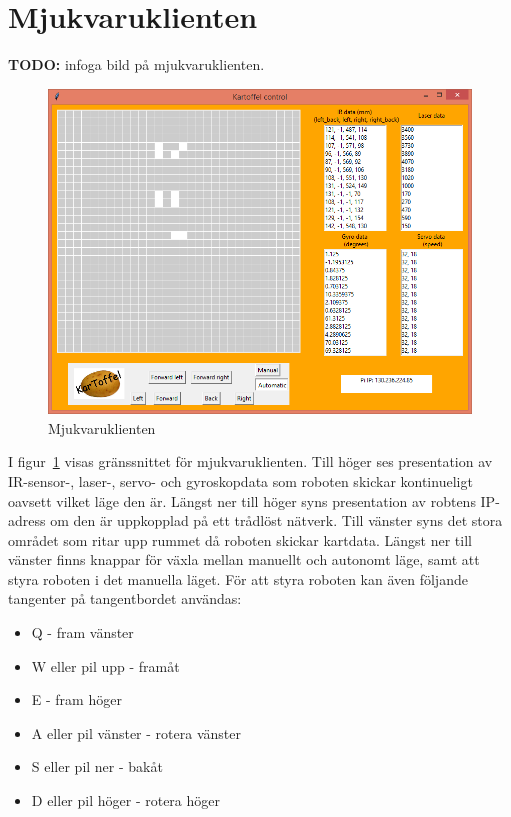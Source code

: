 \documentclass{article}
\begin{document}
\section{Mjukvaruklienten}
\textbf{TODO:} infoga bild på mjukvaruklienten.
\begin{figure}[H]
\centering
\includegraphics[scale=0.55]{client1}
\caption{Mjukvaruklienten}
\label{fig:client1}
\end{figure}
I figur~\ref{fig:client1} visas gränssnittet för mjukvaruklienten. Till höger ses presentation av IR-sensor-, laser-, servo- och gyroskopdata som roboten skickar kontinueligt oavsett vilket läge den är. Längst ner till höger syns presentation av robtens IP-adress om den är uppkopplad på ett trådlöst nätverk. 
Till vänster syns det stora området som ritar upp rummet då roboten skickar kartdata. Längst ner till vänster finns knappar för växla mellan manuellt och autonomt läge, samt att styra roboten i det manuella läget. För att styra roboten kan även följande tangenter på tangentbordet användas:
\begin{itemize}
    \item Q - fram vänster
    \item W eller pil upp - framåt
    \item E - fram höger
    \item A eller pil vänster - rotera vänster
    \item S eller pil ner - bakåt
    \item D eller pil höger - rotera höger
\end{itemize}
\end{document}
